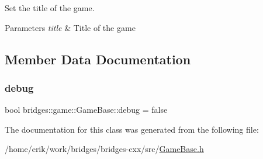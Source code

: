 Set the title of the game. 


\begin{DoxyParams}{Parameters}
{\em title} & Title of the game \\
\hline
\end{DoxyParams}


\subsection{Member Data Documentation}
\mbox{\label{classbridges_1_1game_1_1_game_base_ad2af01edd927a31613d3b881286541bb}} 
\subsubsection{\texorpdfstring{debug}{debug}}
{\footnotesize\ttfamily bool bridges\+::game\+::\+Game\+Base\+::debug = false\hspace{0.3cm}{\ttfamily [protected]}}



The documentation for this class was generated from the following file\+:\begin{DoxyCompactItemize}
\item 
/home/erik/work/bridges/bridges-\/cxx/src/\hyperlink{_game_base_8h}{Game\+Base.\+h}\end{DoxyCompactItemize}
